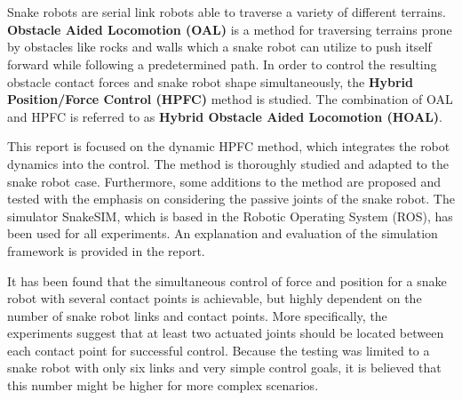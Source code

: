 \chapter{\abstractname}


Snake robots are serial link robots able to traverse a variety of different terrains. 
\textbf{Obstacle Aided Locomotion (OAL)} is a method for traversing terrains prone by obstacles like rocks and walls which a snake robot can utilize to push itself forward while following a predetermined path. In order to control the resulting obstacle contact forces and snake robot shape simultaneously, the \textbf{Hybrid Position/Force Control (HPFC)} method is studied. The combination of OAL and HPFC is referred to as \textbf{Hybrid Obstacle Aided Locomotion (HOAL)}.

This report is focused on the dynamic HPFC method, which integrates the robot dynamics into the control. The method is thoroughly studied and adapted to the snake robot case. Furthermore, some additions to the method are proposed and tested with the emphasis on considering the passive joints of the snake robot. 
The simulator SnakeSIM, which is based in the Robotic Operating System (ROS), has been used for all experiments. An explanation and evaluation of the simulation framework is provided in the report.

It has been found that the simultaneous control of force and position for a snake robot with several contact points is achievable, but highly dependent on the number of snake robot links and contact points. More specifically, the experiments suggest that at least two actuated joints should be located between each contact point for successful control. Because the testing was limited to a snake robot with only six links and very simple control goals, it is believed that this number might be higher for more complex scenarios.




\makeatletter
{}


\makeatother







